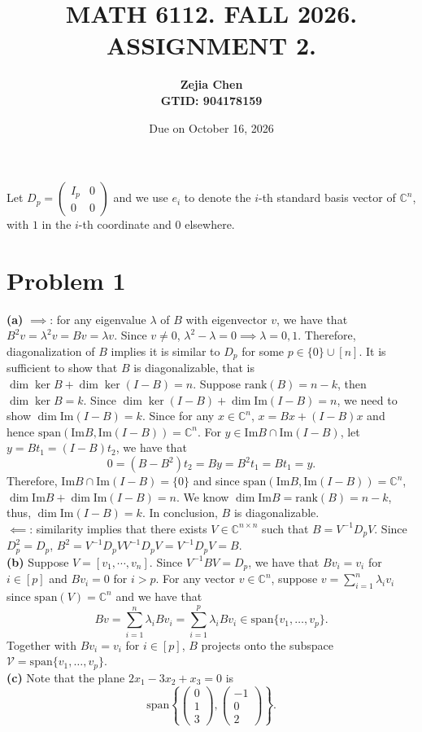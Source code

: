 \documentclass[11pt]{article}
\title{MATH 6112. FALL 2026. ASSIGNMENT 2.}
\date{Due on October 16, 2026}
\author{{\textbf{Zejia Chen}} \\ \textbf{GTID: 904178159}}
\theoremstyle{plain}
\theoremstyle{definition}
\theoremstyle{remark}
\newcommand{\C}{\mathbb{C}}
\def\+#1{\mathcal{#1}} %
\def\-#1{\mathrm{#1}} %
\begin{document}
\maketitle
Let $D_p = \begin{pmatrix} I_p & 0\\0 & 0\end{pmatrix}$ and we use $e_i$ to denote the $i$-th standard basis vector of $\C^n$, with $1$ in the $i$-th coordinate and $0$ elsewhere.
\section*{Problem 1}
\textbf{(a)}
$\boldsymbol{\implies}$: for any eigenvalue $\lambda$ of $B$ with eigenvector $v$, we have that $B^2v = \lambda^2 v = Bv = \lambda v$.
Since $v\neq 0$, $\lambda^2 - \lambda = 0 \implies \lambda = 0,1$.
Therefore, diagonalization of $B$ implies it is similar to $D_p$ for some $p\in\{0\}\cup[n]$.
It is sufficient to show that $B$ is diagonalizable, that is $\dim \ker B + \dim \ker (I-B) = n$.
Suppose $\-{rank}(B) = n-k$, then $\dim \ker B = k$.
Since $\dim \ker (I-B)+\dim \-{Im} (I-B) = n$, we need to show $\dim \-{Im} (I-B) = k$.
Since for any $x\in \C^n$, $x = Bx + (I-B)x$ and hence $\-{span}(\-{Im} B , \-{Im}(I-B)) = \C^n$.
For $y\in \-{Im} B \cap \-{Im}(I-B)$, let $y = Bt_1 = (I-B)t_2$, we have that
$$
    0 = (B-B^2)t_2 = By = B^2 t_1 = Bt_1 = y .
$$
Therefore, $\-{Im} B \cap \-{Im}(I-B) = \{0\}$ and since $\-{span}(\-{Im} B, \-{Im}(I-B)) = \C^n$, $\dim \-{Im} B + \dim \-{Im}(I-B) = n$.
We know $\dim \-{Im} B = \-{rank}(B) = n-k$, thus, $\dim \-{Im}(I-B) = k$.
In conclusion, $B$ is diagonalizable.
\\$\boldsymbol{\impliedby}$: similarity implies that there exists $V\in \C^{n\times n}$ such that $B = V^{-1} D_p V$.
Since $D_p^2=D_p$, $B^2 = V^{-1} D_p V V^{-1} D_p V = V^{-1} D_p V = B$.
\\\textbf{(b)} Suppose $V = [v_1,\cdots,v_n]$.
Since $V^{-1}BV = D_p$, we have that $Bv_i = v_i$ for $i\in[p]$ and $Bv_i = 0$ for $i > p$.
For any vector $v \in \C^n$, suppose $v = \sum_{i=1}^n \lambda_i v_i$ since $\-{span}(V) = \C^n$ and we have that
$$
    Bv = \sum_{i=1}^n \lambda_i Bv_i = \sum_{i=1}^p \lambda_i Bv_i \in \-{span}\{v_1,\ldots,v_p\}.
$$ 
Together with $Bv_i = v_i$ for $i\in[p]$, $B$ projects onto the subspace $\+V = \-{span}\{v_1,\ldots,v_p\}$.
\\\textbf{(c)}
Note that the plane $2x_1 - 3x_2 + x_3 = 0$ is 
$$
    \-{span}\left\{\begin{pmatrix}
    0\\1\\3
    \end{pmatrix},\begin{pmatrix}
    -1\\0\\2
    \end{pmatrix}\right\}. 
$$
\end{document}

